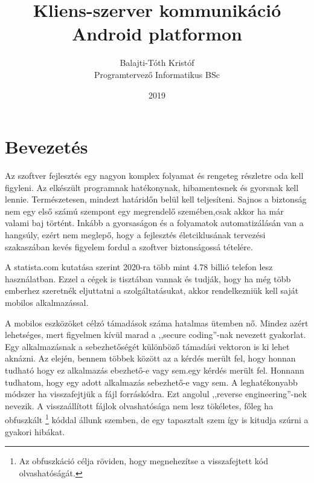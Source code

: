 \documentclass{thesis-ekf}
\theoremstyle{definition}
\theoremstyle{remark}
\begin{document}
\title{Kliens-szerver kommunikáció\\Android platformon}
\author{Balajti-Tóth Kristóf\\Programtervező Informatikus BSc}
\date{2019}
\maketitle
\tableofcontents

\chapter*{Bevezetés}
Az szoftver fejlesztés egy nagyon komplex folyamat és rengeteg részletre oda kell figyleni.
Az elkészült programnak hatékonynak, hibamentesnek és gyorsnak kell lennie. Természetesen, mindezt határidőn belül kell teljesíteni.
Sajnos a biztonság nem egy első számú szempont egy megrendelő szemében,csak akkor ha már valami baj történt.
Inkább a gyorsaságon és a folyamatok automatizálásán van a hangsúly, ezért nem  meglepő, hogy a fejlesztés életciklusának tervezési szakaszában kevés figyelem fordul a szoftver biztonságossá tételére.

A statista.com \cite{statista} kutatása szerint 2020-ra több mint 4.78 billió telefon lesz használatban.
Ezzel a cégek is tisztában vannak és tudják, hogy ha még több emberhez szeretnék eljuttatni a szolgáltatásukat, akkor rendelkezniük kell saját mobilos alkalmazással.

A mobilos eszközöket célzó támadások száma hatalmas ütemben nő. Mindez azért lehetséges, mert figyelmen kívül marad a ,,secure coding''-nak nevezett gyakorlat.
Egy alkalmazásnak a sebezhetőségét különböző támadási vektoron is ki lehet aknázni.
Az elején, bennem többek között az a kérdés merült fel, hogy honnan tudható hogy ez alkalmazás ebezhető-e vagy sem.egy kérdés merült fel. Honnann tudhatom, hogy egy adott alkalmazás sebezhető-e vagy sem. A leghatékonyabb módszer ha visszafejtjük a fájl forráskódra. Ezt angolul ,,reverse engineering''-nek nevezik. A visszaállított fájlok olvashatósága nem lesz tökéletes, főleg ha obfuszkált \footnote{Az obfuszkáció célja röviden, hogy megnehezítse a visszafejtett kód olvashatóságát.} kóddal állunk szemben, de egy tapasztalt szem így is kitudja szúrni a gyakori hibákat.
\end{document}

